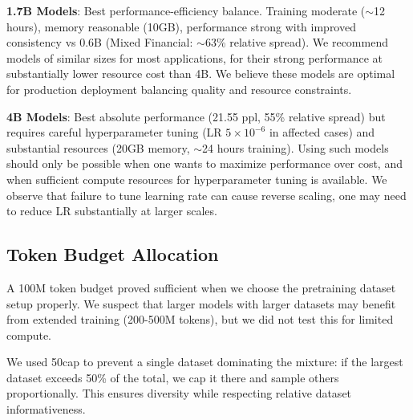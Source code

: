 \textbf{1.7B Models}: Best performance-efficiency balance. Training moderate ($\sim$12 hours), memory reasonable (10GB), performance strong with improved consistency vs 0.6B (Mixed Financial: $\sim$63\% relative spread). We recommend models of similar sizes for most applications, for their strong performance at substantially lower resource cost than 4B. We believe these models are optimal for production deployment balancing quality and resource constraints.

\textbf{4B Models}: Best absolute performance (21.55 ppl, 55\% relative spread) but requires careful hyperparameter tuning (LR $5 \times 10^{-6}$ in affected cases) and substantial resources (20GB memory, $\sim$24 hours training). Using such models should only be possible when one wants to maximize performance over cost, and when sufficient compute resources for hyperparameter tuning is available. We observe that failure to tune learning rate can cause reverse scaling, one may need to reduce LR substantially at larger scales.

\subsection{Token Budget Allocation}

A 100M token budget proved sufficient when we choose the pretraining dataset setup properly. We suspect that larger models with larger datasets may benefit from extended training (200-500M tokens), but we did not test this for limited compute.

We used 50cap to prevent a single dataset dominating the mixture: if the largest dataset exceeds 50\% of the total, we cap it there and sample others proportionally. This ensures diversity while respecting relative dataset informativeness.